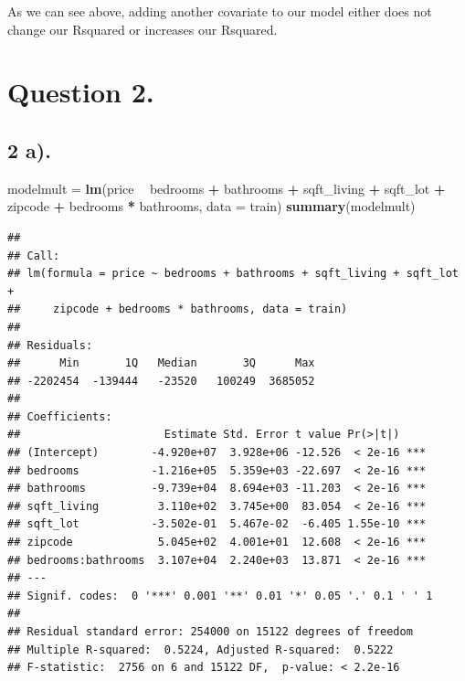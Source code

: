 \documentclass[
]{article}
\newenvironment{Shaded}{\begin{snugshade}}{\end{snugshade}}
\newcommand{\DataTypeTok}[1]{\textcolor[rgb]{0.13,0.29,0.53}{#1}}
\newcommand{\KeywordTok}[1]{\textcolor[rgb]{0.13,0.29,0.53}{\textbf{#1}}}
\newcommand{\NormalTok}[1]{#1}
\newcommand{\OperatorTok}[1]{\textcolor[rgb]{0.81,0.36,0.00}{\textbf{#1}}}
\newcommand{\StringTok}[1]{\textcolor[rgb]{0.31,0.60,0.02}{#1}}
\begin{document}
As we can see above, adding another covariate to our model either does
not change our Rsquared or increases our Rsquared.

\hypertarget{question-2.}{%
\section{Question 2.}\label{question-2.}}

\hypertarget{a.}{%
\subsection{2 a).}\label{a.}}

\begin{Shaded}
\begin{Highlighting}[]
\NormalTok{modelmult =}\StringTok{ }\KeywordTok{lm}\NormalTok{(price }\OperatorTok{~}\StringTok{ }\NormalTok{bedrooms }\OperatorTok{+}\StringTok{ }\NormalTok{bathrooms }\OperatorTok{+}\StringTok{ }\NormalTok{sqft_living }\OperatorTok{+}\StringTok{ }\NormalTok{sqft_lot }\OperatorTok{+}\StringTok{ }\NormalTok{zipcode }\OperatorTok{+}\StringTok{ }\NormalTok{bedrooms }\OperatorTok{*}\StringTok{ }\NormalTok{bathrooms, }\DataTypeTok{data =}\NormalTok{ train)}
\KeywordTok{summary}\NormalTok{(modelmult)}
\end{Highlighting}
\end{Shaded}

\begin{verbatim}
## 
## Call:
## lm(formula = price ~ bedrooms + bathrooms + sqft_living + sqft_lot + 
##     zipcode + bedrooms * bathrooms, data = train)
## 
## Residuals:
##      Min       1Q   Median       3Q      Max 
## -2202454  -139444   -23520   100249  3685052 
## 
## Coefficients:
##                      Estimate Std. Error t value Pr(>|t|)    
## (Intercept)        -4.920e+07  3.928e+06 -12.526  < 2e-16 ***
## bedrooms           -1.216e+05  5.359e+03 -22.697  < 2e-16 ***
## bathrooms          -9.739e+04  8.694e+03 -11.203  < 2e-16 ***
## sqft_living         3.110e+02  3.745e+00  83.054  < 2e-16 ***
## sqft_lot           -3.502e-01  5.467e-02  -6.405 1.55e-10 ***
## zipcode             5.045e+02  4.001e+01  12.608  < 2e-16 ***
## bedrooms:bathrooms  3.107e+04  2.240e+03  13.871  < 2e-16 ***
## ---
## Signif. codes:  0 '***' 0.001 '**' 0.01 '*' 0.05 '.' 0.1 ' ' 1
## 
## Residual standard error: 254000 on 15122 degrees of freedom
## Multiple R-squared:  0.5224, Adjusted R-squared:  0.5222 
## F-statistic:  2756 on 6 and 15122 DF,  p-value: < 2.2e-16
\end{verbatim}
\end{document}
